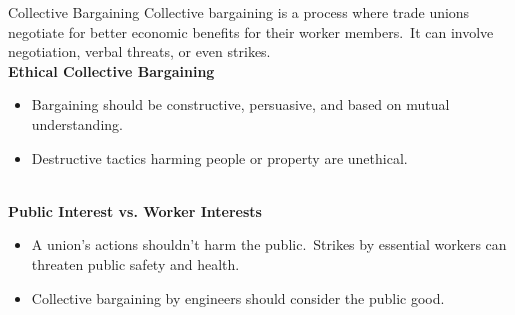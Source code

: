\documentclass[11pt]{beamer}
\begin{document}
    \begin{frame}[t,allowframebreaks]{Collective Bargaining}
        Collective bargaining is a process where trade unions negotiate for better economic benefits for their worker
        members.\ It can involve negotiation, verbal threats, or even strikes.
        \\[10pt]
        \textbf{Ethical Collective Bargaining}\\[5pt]
        \begin{itemize}
            \item Bargaining should be constructive, persuasive, and based on mutual understanding.
            \item Destructive tactics harming people or property are unethical.
        \end{itemize}
        \\[10pt]
        \textbf{Public Interest vs. Worker Interests}\\[5pt]
        \begin{itemize}
            \item A union's actions shouldn't harm the public.\ Strikes by essential workers can threaten public
            safety and health.
            \item Collective bargaining by engineers should consider the public good.
        \end{itemize}

        \framebreak


\end{frame}
\end{document}
